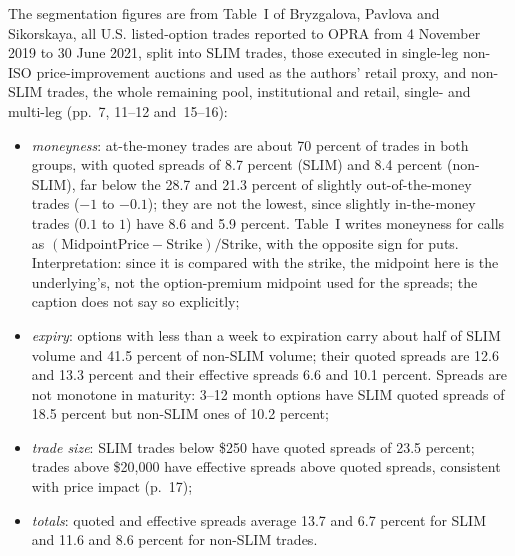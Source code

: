 \begin{qfmethod}
 The segmentation figures are from Table~I of Bryzgalova, Pavlova and Sikorskaya, all U.S. listed-option trades reported to OPRA from 4 November 2019 to 30 June 2021, split into SLIM trades, those executed in single-leg non-ISO price-improvement auctions and used as the authors' retail proxy, and non-SLIM trades, the whole remaining pool, institutional and retail, single- and multi-leg (pp.~7, 11--12 and~15--16):
\begin{itemize}
\item \emph{moneyness}: at-the-money trades are about 70 percent of trades in both groups, with quoted spreads of 8.7 percent (SLIM) and 8.4 percent (non-SLIM), far below the 28.7 and 21.3 percent of slightly out-of-the-money trades ($-1$ to $-0.1$); they are not the lowest, since slightly in-the-money trades ($0.1$ to $1$) have 8.6 and 5.9 percent. Table~I writes moneyness for calls as $(\text{MidpointPrice}-\text{Strike})/\text{Strike}$, with the opposite sign for puts. Interpretation: since it is compared with the strike, the midpoint here is the underlying's, not the option-premium midpoint used for the spreads; the caption does not say so explicitly;
\item \emph{expiry}: options with less than a week to expiration carry about half of SLIM volume and 41.5 percent of non-SLIM volume; their quoted spreads are 12.6 and 13.3 percent and their effective spreads 6.6 and 10.1 percent. Spreads are not monotone in maturity: 3--12 month options have SLIM quoted spreads of 18.5 percent but non-SLIM ones of 10.2 percent;
\item \emph{trade size}: SLIM trades below \$250 have quoted spreads of 23.5 percent; trades above \$20{,}000 have effective spreads above quoted spreads, consistent with price impact (p.~17);
\item \emph{totals}: quoted and effective spreads average 13.7 and 6.7 percent for SLIM and 11.6 and 8.6 percent for non-SLIM trades.
\end{itemize}


\end{qfmethod}

